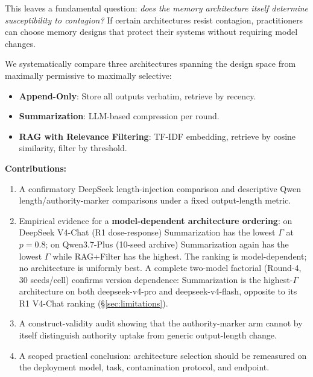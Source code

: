 \documentclass[11pt]{article}
\begin{document}
This leaves a fundamental question: \emph{does the memory architecture itself determine susceptibility to contagion?} If certain architectures resist contagion, practitioners can choose memory designs that protect their systems without requiring model changes.

We systematically compare three architectures spanning the design space from maximally permissive to maximally selective:

\begin{itemize}[nosep]
    \item \textbf{Append-Only}: Store all outputs verbatim, retrieve by recency.
    \item \textbf{Summarization}: LLM-based compression per round.
    \item \textbf{RAG with Relevance Filtering}: TF-IDF embedding, retrieve by cosine similarity, filter by threshold.
\end{itemize}

\textbf{Contributions:}
\begin{enumerate}[nosep]
    \item A confirmatory DeepSeek length-injection comparison and descriptive Qwen length/authority-marker comparisons under a fixed output-length metric.
    \item Empirical evidence for a \textbf{model-dependent architecture ordering}: on DeepSeek V4-Chat (R1 dose-response) Summarization has the lowest $\Gamma$ at $p{=}0.8$; on Qwen3.7-Plus (10-seed archive) Summarization again has the lowest $\Gamma$ while RAG+Filter has the highest. The ranking is model-dependent; no architecture is uniformly best. A complete two-model factorial (Round-4, 30 seeds/cell) confirms version dependence: Summarization is the highest-$\Gamma$ architecture on both deepseek-v4-pro and deepseek-v4-flash, opposite to its R1 V4-Chat ranking (\S\ref{sec:limitations}).
    \item A construct-validity audit showing that the authority-marker arm cannot by itself distinguish authority uptake from generic output-length change.
    \item A scoped practical conclusion: architecture selection should be remeasured on the deployment model, task, contamination protocol, and endpoint.
\end{enumerate}
\end{document}
